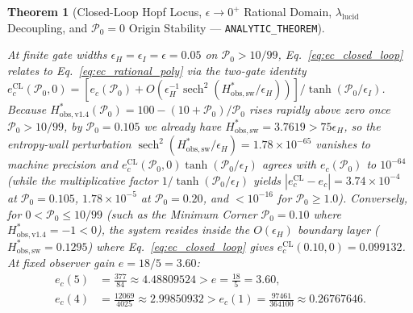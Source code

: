 \documentclass[11pt,a4paper]{article}
\newtheorem{theorem}{Theorem}
\theoremstyle{definition}
\begin{document}
\begin{theorem}[Closed-Loop Hopf Locus, $\epsilon \to 0^+$ Rational Domain, $\lambda_{\mathrm{lucid}}$ Decoupling, and $\mathcal{P}_0 = 0$ Origin Stability --- \texttt{ANALYTIC\_THEOREM}]
\begin{enumerate}
  At finite gate widths $\epsilon_H = \epsilon_I = \epsilon = 0.05$ on $\mathcal{P}_0 > 10/99$, Eq.~\eqref{eq:ec_closed_loop} relates to Eq.~\eqref{eq:ec_rational_poly} via the two-gate identity $e_c^{\mathrm{CL}}(\mathcal{P}_0, 0) = \left[e_c(\mathcal{P}_0) + O\!\left(\epsilon_H^{-1}\operatorname{sech}^2(H_{\mathrm{obs},\mathrm{sw}}^*/\epsilon_H)\right)\right] / \tanh(\mathcal{P}_0/\epsilon_I)$. Because $H_{\mathrm{obs},\mathrm{v1.4}}^*(\mathcal{P}_0) = 100 - (10+\mathcal{P}_0)/\mathcal{P}_0$ rises rapidly above zero once $\mathcal{P}_0 > 10/99$, by $\mathcal{P}_0 = 0.105$ we already have $H_{\mathrm{obs},\mathrm{sw}}^* = 3.7619 > 75\epsilon_H$, so the entropy-wall perturbation $\operatorname{sech}^2(H_{\mathrm{obs},\mathrm{sw}}^*/\epsilon_H) = 1.78 \times 10^{-65}$ vanishes to machine precision and $e_c^{\mathrm{CL}}(\mathcal{P}_0, 0)\tanh(\mathcal{P}_0/\epsilon_I)$ agrees with $e_c(\mathcal{P}_0)$ to $10^{-64}$ (while the multiplicative factor $1/\tanh(\mathcal{P}_0/\epsilon_I)$ yields $|e_c^{\mathrm{CL}} - e_c| = 3.74 \times 10^{-4}$ at $\mathcal{P}_0 = 0.105$, $1.78 \times 10^{-5}$ at $\mathcal{P}_0 = 0.20$, and $< 10^{-16}$ for $\mathcal{P}_0 \ge 1.0$). Conversely, for $0 < \mathcal{P}_0 \le 10/99$ (such as the Minimum Corner $\mathcal{P}_0 = 0.10$ where $H_{\mathrm{obs},\mathrm{v1.4}}^* = -1 < 0$), the system resides inside the $O(\epsilon_H)$ boundary layer ($H_{\mathrm{obs},\mathrm{sw}}^* = 0.1295$) where Eq.~\eqref{eq:ec_closed_loop} gives $e_c^{\mathrm{CL}}(0.10, 0) = 0.099132$. At fixed observer gain $e = 18/5 = 3.60$:
  \begin{align}
  e_c(5) &= \frac{377}{84} \approx 4.48809524 > e = \frac{18}{5} = 3.60, \\
  e_c(4) &= \frac{12069}{4025} \approx 2.99850932 > e_c(1) = \frac{97461}{364100} \approx 0.26767646.
  \end{align}


\end{enumerate}
\end{theorem}
\end{document}
